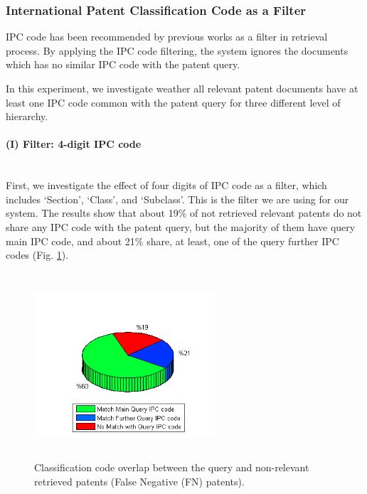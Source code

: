 \subsubsection{International Patent Classification Code as a Filter}
IPC code has been recommended by previous works as a filter in retrieval process. By applying the IPC code filtering, the system ignores the documents which has no similar IPC code with the patent query. 

In this experiment, we investigate weather all relevant patent documents have at least one IPC code common with the patent query for three different level of hierarchy. 
\paragraph{(I) Filter: 4-digit IPC code}
\ \\
First, we investigate the effect of four digits of IPC code as a filter, which includes `Section', `Class', and `Subclass'. 
This is the filter we are using for our system. 
The results show that about 19\% of not retrieved relevant patents do not share any IPC code with the patent query, but the majority of them have query main IPC code, and about 21\% share, at least, one of the query further IPC codes (Fig. \ref{fig:fnipcoverlap}). 
\begin{figure}[t!]
   \centering
   \includegraphics[width=0.60\textwidth,height=69mm]{figs/ipcOverlap-FNs.png}
   \caption{Classification code overlap between the query and non-relevant retrieved patents (False Negative (FN) patents).}   
   \label{fig:fnipcoverlap} 
\end{figure}
